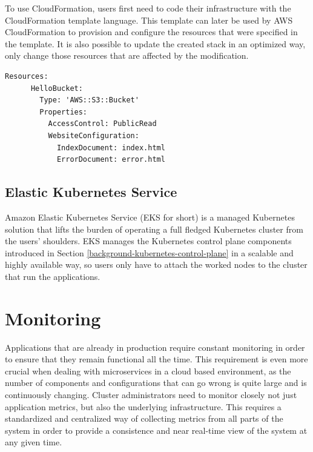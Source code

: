 To use CloudFormation, users first need to code their infrastructure with the CloudFormation template language. This template can later be used by AWS CloudFormation to provision and configure the resources that were specified in the template. It is also possible to update the created stack in an optimized way, only change those resources that are affected by the modification.

\vspace{0.5cm}
\begin{minipage}{\linewidth}
	\begin{lstlisting}[caption={Example CloudFormation template of an S3 bucket \cite{AWSCloudFormationExample}}, label={lst:aws-cf-bucket}]
	Resources:
	  HelloBucket:
	    Type: 'AWS::S3::Bucket'
	    Properties:
	      AccessControl: PublicRead
	      WebsiteConfiguration:
	        IndexDocument: index.html
	        ErrorDocument: error.html
	\end{lstlisting}
\end{minipage}

\subsection{Elastic Kubernetes Service}

Amazon Elastic Kubernetes Service (EKS for short) is a managed Kubernetes solution that lifts the burden of operating a full fledged Kubernetes cluster from the users' shoulders. EKS manages the Kubernetes control plane components introduced in Section \ref{background-kubernetes-control-plane} in a scalable and highly available way, so users only have to attach the worked nodes to the cluster that run the applications. \cite{AWSEKS}

\section{Monitoring}

Applications that are already in production require constant monitoring in order to ensure that they remain functional all the time. This requirement is even more crucial when dealing with microservices in a cloud based environment, as the number of components and configurations that can go wrong is quite large and is continuously changing. Cluster administrators need to monitor closely not just application metrics, but also the underlying infrastructure. This requires a standardized and centralized way of collecting metrics from all parts of the system in order to provide a consistence and near real-time view of the system at any given time.

